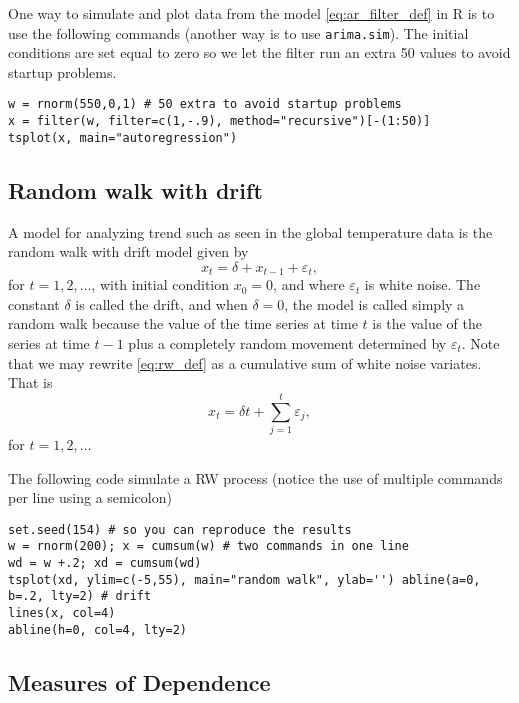 \documentclass[
paper=128mm:96mm, %
fontsize=9.5pt, %
pagesize, %
parskip=half-, %
]{scrartcl} %
\theoremstyle{mythmstyle} %
\begin{document}
One way to simulate and plot data from the model \eqref{eq:ar_filter_def} in R is to use the following commands (another way is to use \texttt{arima.sim}). The initial conditions are set equal to zero so we let the filter run an extra 50 values to avoid startup problems.

\begin{lstlisting}[belowskip=-0.8 \baselineskip]
w = rnorm(550,0,1) # 50 extra to avoid startup problems
x = filter(w, filter=c(1,-.9), method="recursive")[-(1:50)] 
tsplot(x, main="autoregression")
\end{lstlisting}
\clearpage

\subsection{Random walk with drift}

A model for analyzing trend such as seen in the global temperature data is the random walk with drift model given by
\begin{equation}
\label{eq:rw_def}
x_t=\delta+x_{t-1}+\varepsilon_{t},
\end{equation}
%
for $t=1,2,\dots$, with initial condition $x_0=0$, and where $\varepsilon_{t}$ is white noise. The constant $\delta$ is called the drift, and when $\delta=0$, the model is called simply a random walk because the value of the time series at time $t$ is the value of the series at time $t-1$ plus a completely random movement determined by $\varepsilon_{t}$. Note that we may rewrite \eqref{eq:rw_def} as a cumulative sum of white noise variates. That is
%
\begin{equation}
\label{eq:rw_def_2}
x_t=\delta t+\sum_{j=1}^t\varepsilon_{j},
\end{equation}
%
for $t=1,2,\dots$ 
\clearpage

The following code simulate a RW process (notice the use of multiple commands per line using a semicolon)

\begin{lstlisting}[belowskip=-0.8 \baselineskip]
set.seed(154) # so you can reproduce the results 
w = rnorm(200); x = cumsum(w) # two commands in one line 
wd = w +.2; xd = cumsum(wd)
tsplot(xd, ylim=c(-5,55), main="random walk", ylab='') abline(a=0, b=.2, lty=2) # drift
lines(x, col=4)
abline(h=0, col=4, lty=2)
\end{lstlisting}
\clearpage

\subsection{Measures of Dependence}
\end{document}

